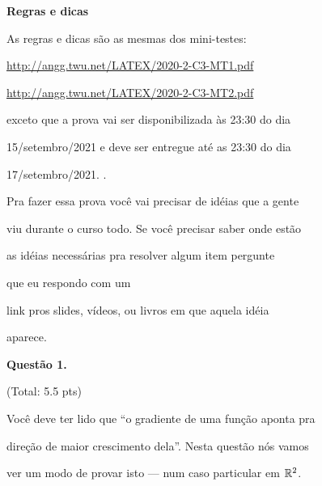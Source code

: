 \documentclass[oneside,12pt]{article}
\begin{document}
\newpage


{\bf Regras e dicas}

As regras e dicas são as mesmas dos mini-testes:

\ssk

\url{http://angg.twu.net/LATEX/2020-2-C3-MT1.pdf}

\url{http://angg.twu.net/LATEX/2020-2-C3-MT2.pdf}

\ssk

exceto que a prova vai ser disponibilizada às 23:30 do dia

15/setembro/2021 e deve ser entregue até as 23:30 do dia

17/setembro/2021. .

\bsk

Pra fazer essa prova você vai precisar de idéias que a gente

viu durante o curso todo. Se você precisar saber onde estão

as idéias necessárias pra resolver algum item pergunte

 que eu respondo com um

link pros slides, vídeos, ou livros em que aquela idéia

aparece.




\newpage


{\bf Questão 1.}

\T(Total: 5.5 pts)

\ssk

Você deve ter lido que ``o gradiente de uma função aponta pra

direção de maior crescimento dela''. Nesta questão nós vamos

ver um modo de provar isto --- num caso particular em $\mathbb{R}^2$.

\def\questaoumcasogeral{
  \begin{array}[t]{rcl}
       F &:& \R^2 → \R  \\
     P_0 &∈& \R^2       \\
     \vv &=& ∇F(P_0)    \\
     \vv &=& \VEC{a,b}  \\
     \uu &⊥& \vv, \text{ obedecendo } ||\uu|| = ||\vv|| \\
       A &=& \setofst{Q∈\R^2}{d(P_0,Q) = ||\vv||} \\
       B &=& \{ P_0 + \VEC{\pm a, \pm b} \}
           ∪ \{ P_0 + \VEC{\pm b, \pm a} \} \\
       θ &∈& \R \\
     \ww &=& (\cos θ)\vv + (\senθ)\uu \\
  \end{array}
  }
\end{document}
